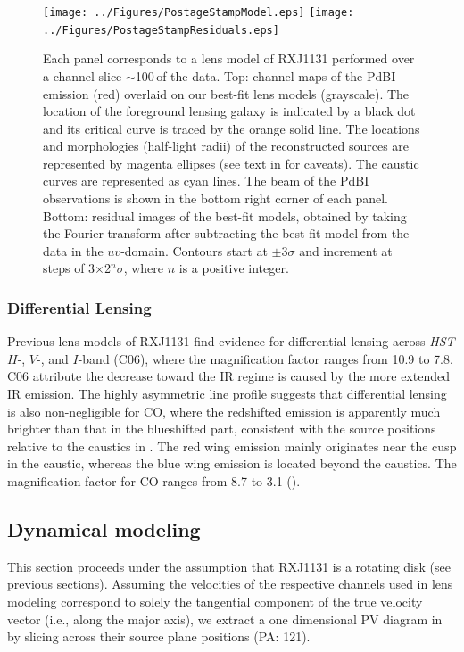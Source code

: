 \documentclass[]{emulateapj}
\begin{document}
\begin{figure}[tbph]
\texttt{[image: ../Figures/PostageStampModel.eps]}
\texttt{[image: ../Figures/PostageStampResiduals.eps]}
\caption{Each panel corresponds to a lens model of RXJ1131 performed over a
channel slice $\sim$100\,\kms of the \bco data. Top: channel maps of the
PdBI \bco emission (red) overlaid on our best-fit lens models (grayscale).
The location of the foreground lensing galaxy is indicated by a black dot and
its critical curve is traced by the orange solid line. The locations and
morphologies (half-light radii) of the reconstructed sources are
represented by magenta ellipses (see text in  for caveats).
The caustic curves are represented as cyan lines. The beam of the
PdBI observations is shown in the bottom right corner of each panel.
Bottom: residual images of the best-fit models, obtained by
taking the Fourier transform after subtracting the best-fit model from the
data in the $uv$-domain. Contours start
at $\pm$3$\sigma$ and increment at steps of 3$\times$2$^n\sigma$,
where $n$ is a positive integer.
\label{fig:model}}
\end{figure}

\subsubsection{Differential Lensing} \label{sec:differential} %

Previous lens models of RXJ1131 find evidence for
differential lensing across {\it HST}
$H$-, $V$-, and $I$-band (C06), where the
magnification factor ranges from 10.9 to 7.8. C06 attribute
the decrease toward the IR regime is caused by the more extended
IR emission. The highly asymmetric \bco line profile suggests that
differential lensing is also non-negligible for CO, where the redshifted
emission is apparently much brighter than that in the
blueshifted part, consistent
with the source positions relative to the caustics in .
The red wing emission mainly originates near the cusp
in the caustic, whereas the blue wing emission is located beyond the caustics.
The magnification factor for CO ranges from 8.7 to 3.1 ().

\subsection{\bco Dynamical modeling} \label{sec:dynamics} %
This section proceeds under the assumption that RXJ1131 is
a rotating disk (see previous sections).
Assuming the velocities of the respective channels used in
lens modeling correspond to solely the tangential component of the
true velocity vector (i.e., along the major axis), we extract
a one dimensional PV diagram in 
by slicing across their source plane positions (PA: 121\degr).
\end{document}
